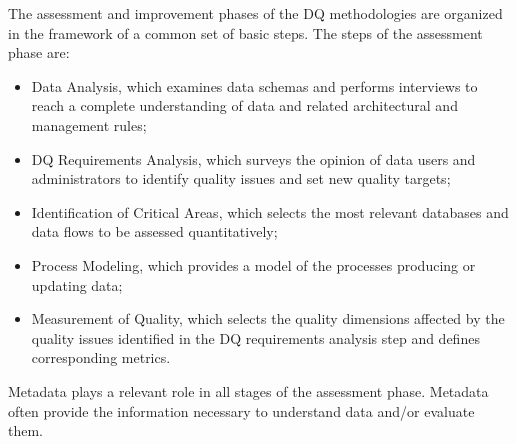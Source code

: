 \documentclass[pdftex,english,oribibl]{llncs}
\begin{document}
The assessment and improvement phases of the DQ methodologies are organized in the framework of a common set of basic steps. The steps of the assessment phase are:
\begin{itemize}
    \item Data Analysis, which examines data schemas and performs interviews to reach a complete understanding of data and related architectural and management rules;
    \item DQ Requirements Analysis, which surveys the opinion of data users and administrators to identify quality issues and set new quality targets;
    \item Identification of Critical Areas, which selects the most relevant databases and data flows to be assessed quantitatively;
    \item Process Modeling, which provides a model of the processes producing or updating data;
    \item Measurement of Quality, which selects the quality dimensions affected by the quality issues identified in the DQ requirements analysis step and defines corresponding metrics.
\end{itemize}
Metadata plays a relevant role in all stages of the assessment phase. Metadata often provide the information necessary to understand data and/or evaluate them.
\end{document}
